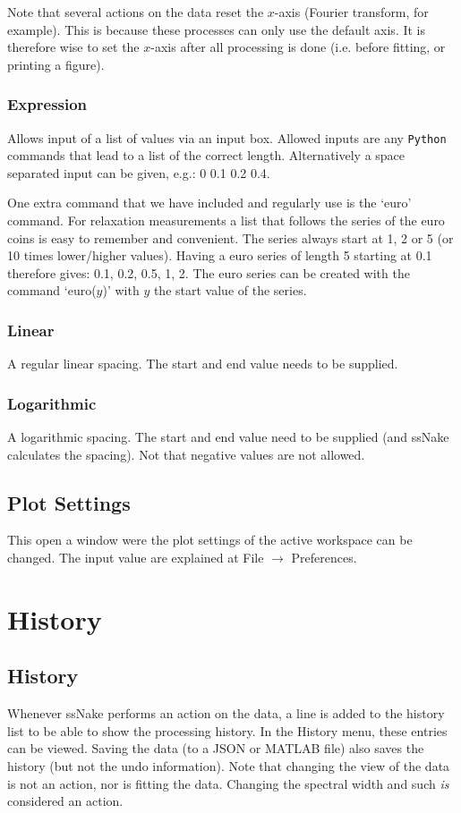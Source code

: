 \documentclass[11pt,a4paper]{article}
\begin{document}
Note that several actions on the data reset the $x$-axis (Fourier transform, for example). This is because
these processes can only use the default axis. It is therefore wise to set the $x$-axis after all processing is
done (i.e. before fitting, or printing a figure).

\subsubsection{Expression}
Allows input of a list of values via an input box. Allowed inputs are any \texttt{Python} commands that lead
to a list of the correct length. Alternatively a space separated input can be given, e.g.: 0 0.1 0.2 0.4.

One extra command that we have included and regularly use is the `euro' command. For relaxation measurements a
list that follows the series of the euro coins is easy to remember and convenient. The series always start at
1, 2 or 5 (or 10 times lower/higher values). Having a euro series of length 5 starting at 0.1 therefore gives:
0.1, 0.2, 0.5, 1, 2. The euro series can be created with the command `euro($y$)' with $y$ the start value of
the series.



\subsubsection{Linear}
A regular linear spacing. The start and end value needs to be supplied.

\subsubsection{Logarithmic}
A logarithmic spacing. The start and end value need to be supplied (and ssNake calculates the spacing). Not
that negative values are not allowed.

\subsection{Plot Settings}
This open a window were the plot settings of the active workspace can be changed. The input value are explained
at File $\rightarrow$ Preferences.


\section{History}
\subsection{History}
Whenever ssNake performs an action on the data, a line is added to the history list to be able to show the processing history. In the History menu, these
entries can be viewed. Saving the data (to a JSON or MATLAB file) also saves the history (but not the undo information). Note that changing the view of the data
is not an action, nor is fitting the data. Changing the spectral width and such \textit{is} considered an action.
\end{document}
